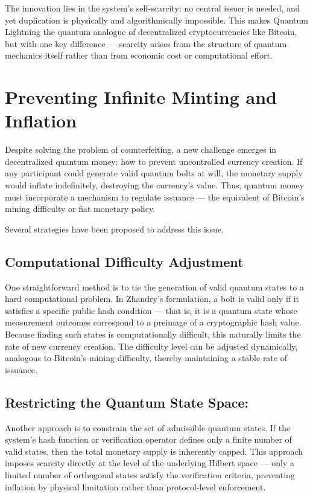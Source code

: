 The innovation lies in the system’s self-scarcity: no central issuer is needed, and yet duplication is physically and algorithmically impossible. This makes Quantum Lightning the quantum analogue of decentralized cryptocurrencies like Bitcoin, but with one key difference — scarcity arises from the structure of quantum mechanics itself rather than from economic cost or computational effort.
\section{Preventing Infinite Minting and Inflation}\label{s:2.1}
Despite solving the problem of counterfeiting, a new challenge emerges in decentralized quantum money: how to prevent uncontrolled currency creation. If any participant could generate valid quantum bolts at will, the monetary supply would inflate indefinitely, destroying the currency’s value. Thus, quantum money must incorporate a mechanism to regulate issuance — the equivalent of Bitcoin’s mining difficulty or fiat monetary policy.

Several strategies have been proposed to address this issue.

\subsection{Computational Difficulty Adjustment}\label{s:2.1}
One straightforward method is to tie the generation of valid quantum states to a hard computational problem. In Zhandry’s formulation, a bolt is valid only if it satisfies a specific public hash condition — that is, it is a quantum state whose measurement outcomes correspond to a preimage of a cryptographic hash value. Because finding such states is computationally difficult, this naturally limits the rate of new currency creation. The difficulty level can be adjusted dynamically, analogous to Bitcoin’s mining difficulty, thereby maintaining a stable rate of issuance.
\subsection{Restricting the Quantum State Space:}\label{s:2.1}
Another approach is to constrain the set of admissible quantum states. If the system’s hash function or verification operator defines only a finite number of valid states, then the total monetary supply is inherently capped. This approach imposes scarcity directly at the level of the underlying Hilbert space — only a limited number of orthogonal states satisfy the verification criteria, preventing inflation by physical limitation rather than protocol-level enforcement.
